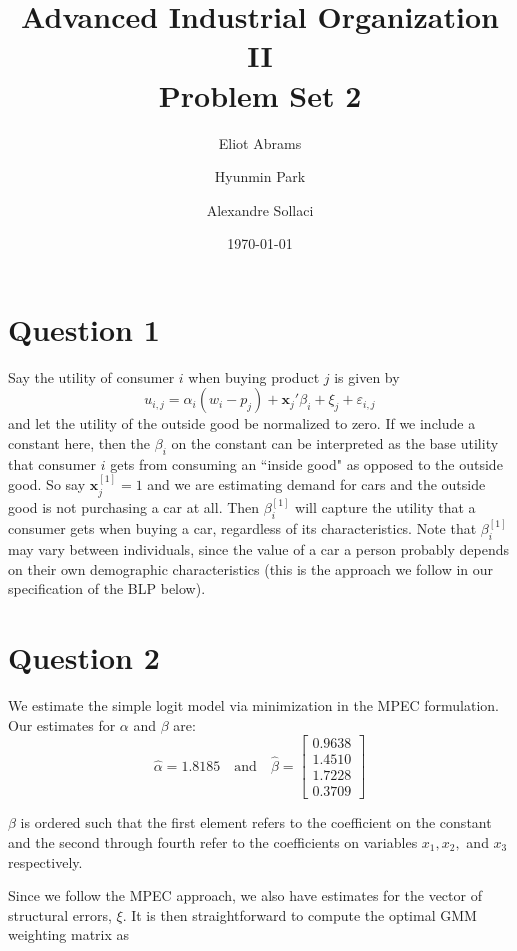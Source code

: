 \documentclass[a4paper,11pt]{article}
\begin{document}
\title{Advanced Industrial Organization II \\ Problem Set 2}
\author{Eliot Abrams \and Hyunmin Park \and Alexandre Sollaci}
\date{\today}
\maketitle

\section*{Question 1}
Say the utility of consumer $i$ when buying product $j$ is given by
\[ u_{i,j} = \alpha_i(w_i - p_j) + \mathbf{x}_j'\beta_i + \xi_j + \varepsilon_{i,j} \]
and let the utility of the outside good be normalized to zero. If we include a constant here, then the $\beta_i$ on the constant can be interpreted as the base utility that consumer $i$ gets from consuming an ``inside good" as opposed to the outside good. So say $\mathbf{x}_j^{[1]} = 1$ and we are estimating demand for cars and the outside good is not purchasing a car at all. Then $\beta_i^{[1]}$ will capture the utility that a consumer gets when buying a car, regardless of its characteristics. Note that $\beta_i^{[1]}$ may vary between individuals, since the value of a car a person probably depends on their own demographic characteristics (this is the approach we follow in our specification of the BLP below). 

\section*{Question 2}
We estimate the simple logit model via minimization in the MPEC formulation. Our estimates for $\alpha$ and $\beta$ are:
\[
\hat\alpha = 1.8185 \quad \mbox{and}  \quad
\hat\beta = \left[\begin{array}{l} 0.9638 \\ 1.4510 \\ 1.7228 \\ 0.3709 \end{array}\right] \]

$\beta$ is ordered such that the first element refers to the coefficient on the constant and the second through fourth refer to the coefficients on variables $x_1, x_2,$ and $x_3$ respectively.

Since we follow the MPEC approach, we also have estimates for the vector of structural errors, $\xi$. It is then straightforward to compute the optimal GMM weighting matrix as
\end{document}
